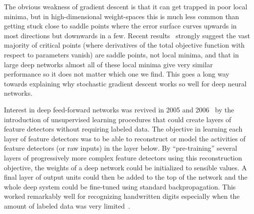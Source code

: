 \documentclass[10pts]{article}
\begin{document}
The obvious weakness of gradient descent is that it can get trapped in poor
local minima, but in high-dimensional weight-spaces this is much less
common than getting stuck close to saddle points where the error surface
curves upwards in most directions but downwards in a few. Recent
results~\citep{Dauphin-et-al-NIPS2014-small,Choromanska-et-al-arxiv2014} strongly suggest
the vast majority of critical points (where derivatives of the total
objective function with respect to parameters vanish) are saddle points, not
local minima, and that in large deep networks almost all of these local minima 
give very similar performance so it does not matter which one we find.  This goes a long way
towards explaining why stochastic gradient descent works so well for deep
neural networks.

Interest in deep feed-forward networks was revived in
2005 and 2006~\citep{IJCAI,Hinton06-small,Bengio-nips-2006-small,ranzato-07-small} 
by the introduction
of unsupervised learning procedures that could create layers of feature
detectors without requiring labeled data. The objective in learning each
layer of feature detectors was to be able to reconstruct or model the
activities of feature detectors (or raw inputs) in the layer below.  By
``pre-training'' several layers of progressively more complex feature
detectors using this reconstruction objective, the weights of a deep
network could be initialized to sensible values.  A final layer of output
units could then be added to the top of the network and the whole deep
system could be fine-tuned using standard
backpropagation\citep{Hinton-Science2006}. This worked remarkably well for recognizing
handwritten digits especially when the amount of labeled data was very
limited~\citep{Bengio-nips-2006-small,Erhan+al-2010-small}.
\end{document}
